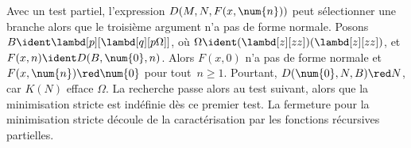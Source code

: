 \documentclass[../../../include/open-logic-section]{subfiles}
\begin{document}
Avec un test partiel, l'expression $D(M,N,F(x,\num{n}))$ peut
sélectionner une branche alors que le troisième argument n'a pas
de forme normale. Posons
$B\ident\lambd[p][\lambd[q][p\Omega]]$,
où $\Omega\ident(\lambd[z][zz])(\lambd[z][zz])$,
et $F(x,n)\ident D(B,\num{0},n)$. Alors $F(x,\num{0})$
n'a pas de forme normale et $F(x,\num{n})\red\num{0}$ pour
tout~$n\ge1$. Pourtant, $D(\num{0},N,B)\red N$, car
$K(N)$ efface $\Omega$. La recherche passe alors au test suivant,
alors que la minimisation stricte est indéfinie dès ce premier
test. La fermeture pour la minimisation stricte découle de
la caractérisation par les fonctions récursives partielles.
\end{document}
